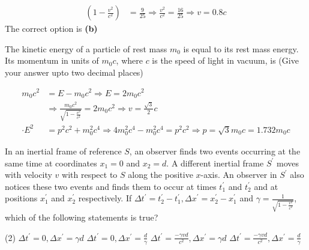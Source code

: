 \begin{enumerate}
\begin{answer}
\begin{align*}
	\left(1-\frac{v^{2}}{c^{2}}\right)&=\frac{9}{25} \Rightarrow \frac{v^{2}}{c^{2}}=\frac{16}{25} \Rightarrow v=0.8 c
	\end{align*}
	The correct option is \textbf{(b)}
\end{answer}
\begin{minipage}{\textwidth}
	\item The kinetic energy of a particle of rest mass $m_{0}$ is equal to its rest mass energy. Its momentum in units of $m_{0} c$, where $c$ is the speed of light in vacuum, is
	(Give your answer upto two decimal places)
\end{minipage}
\begin{answer}
\begin{align*}
m_{0} c^{2}&=E-m_{0} c^{2} \Rightarrow E=2 m_{0} c^{2}\\
&\Rightarrow \frac{m_{0} c^{2}}{\sqrt{1-\frac{v^{2}}{c^{2}}}}=2 m_{0} c^{2} \Rightarrow v=\frac{\sqrt{3}}{2} c\\
\cdot E^{2}&=p^{2} c^{2}+m_{0}^{2} c^{4} \Rightarrow 4 m_{0}^{2} c^{4}-m_{0}^{2} c^{4}=p^{2} c^{2} \Rightarrow p=\sqrt{3} m_{0} c=1.732 m_{0} c
\end{align*}	
\end{answer}
\begin{minipage}{\textwidth}
	\item In an inertial frame of reference $S$, an observer finds two events occurring at the same time at coordinates $x_{1}=0$ and $x_{2}=d$. A different inertial frame $S^{\prime}$ moves with velocity $v$ with respect to $S$ along the positive $x$-axis. An observer in $S^{\prime}$ also notices these two events and finds them to occur at times $t_{1}^{\prime}$ and $t_{2}^{\prime}$ and at positions $x_{1}^{\prime}$ and $x_{2}^{\prime}$ respectively.
	If $\Delta t^{\prime}=t_{2}^{\prime}-t_{1}^{\prime}, \Delta x^{\prime}=x_{2}^{\prime}-x_{1}^{\prime}$ and $\gamma=\frac{1}{\sqrt{1-\frac{v^{2}}{c^{2}}}}$, which of the following statements is true?
\end{minipage}
\begin{tasks}(2)
	\task[\textbf{A.}] $\Delta t^{\prime}=0, \Delta x^{\prime}=\gamma d$
	\task[\textbf{B.}] $\Delta t^{\prime}=0, \Delta x^{\prime}=\frac{d}{\gamma}$
	\task[\textbf{C.}]$\Delta t^{\prime}=\frac{-\gamma v d}{c^{2}}, \Delta x^{\prime}=\gamma d$
	\task[\textbf{D.}] $\Delta t^{\prime}=\frac{-\gamma v d}{c^{2}}, \Delta x^{\prime}=\frac{d}{\gamma}$
\end{tasks}
\begin{answer}

\end{answer}
\end{enumerate}
